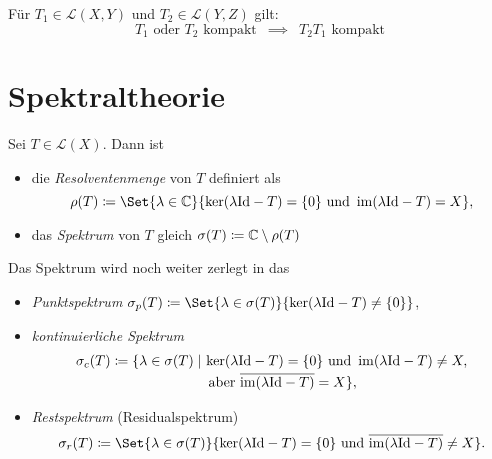\documentclass{cheat-sheet}
\newcommand{\LSO}{\mathcal{L}} %
\begin{document}
\begin{samepage}

\begin{lem}
  Für $T_1 \in \LSO(X, Y)$ und $T_2 \in \LSO(Y, Z)$ gilt:
  \[
    \text{$T_1$ oder $T_2$ kompakt}
    \enspace \implies \enspace
    \text{$T_2 T_1$ kompakt}
  \]
\end{lem}

\iffalse
\begin{bspe}
  \begin{itemize}
    \item Sei $\Omega \opn \R^n$, beschränkt mit $\mathcal{C}^{0,1}$-Rand. Seien $m_1 > m_2 \in \N$ und $1 \leq p_1, p_2 < \infty$ sowie $m_1 - \tfrac{n}{p_1} > m_2 - \tfrac{n}{p_2}$. Dann ist die Einbettung $\Id : W^{m_1,p_1}(\Omega) \to W^{m_2,p_2}(\Omega)$ stetig und kompakt.
    \item Viele Integraloperatoren, vgl. z.\,B. ÜA24
  \end{itemize}
\end{bspe}
\fi

\section{Spektraltheorie}

\end{samepage}


\begin{defn}
  Sei $T \in \LSO(X)$. Dann ist
  \begin{itemize}
    \item die \emph{Resolventenmenge} von $T$ definiert als
    \[ \rho(T) \coloneqq \Set{ \lambda \in \C }{ \ker (\lambda \Id - T) = \{ 0 \} \text{ und } \im (\lambda \Id - T) = X }, \]
    \item das \emph{Spektrum} von $T$ gleich $\sigma(T) \coloneqq \mathbb{C} \setminus \rho(T)$
  \end{itemize}
  Das Spektrum wird noch weiter zerlegt in das
  \begin{itemize}
    \item \emph{Punktspektrum} $\sigma_p(T) \coloneqq \Set{ \lambda \in \sigma(T) }{ \ker(\lambda \Id - T) \not= \{ 0 \} }$,
    \item \emph{kontinuierliche Spektrum}
    \begin{align*}
      \sigma_c(T) \coloneqq \{ \lambda \in \sigma(T) \mid\, &\ker(\lambda \mathrm{Id} - T) = \{ 0 \} \text{ und } \mathop{\mathrm{im}} (\lambda \mathrm{Id} - T) \not= X,\\[-2pt]
      &\text{ aber } \overline{\mathop{\mathrm{im}} (\lambda \mathrm{Id} - T)} = X \},
    \end{align*}
    \item \emph{Restspektrum} (Residualspektrum)
    \[ \sigma_r(T) \coloneqq \Set{ \lambda \in \sigma(T) }{ \ker(\lambda \Id - T) = \{ 0 \} \text{ und } \overline{\im(\lambda \Id - T)} \not= X }. \]
  \end{itemize}
\end{defn}
\end{document}
